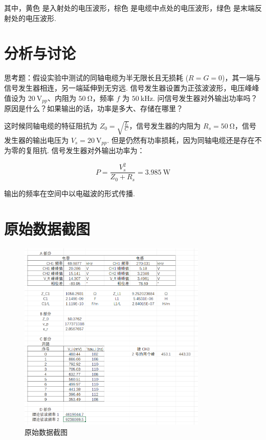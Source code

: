 \documentclass{customDoc}
\begin{document}

其中，\textcolor{yellowwave}{黄色} 是入射处的电压波形，\textcolor{orangewave}{棕色} 是电缆中点处的电压波形，\textcolor{greenwave}{绿色} 是末端反射处的电压波形.

\section{分析与讨论}

思考题：假设实验中测试的同轴电缆为半无限长且无损耗 ($R=G=0$)，其一端与信号发生器相连，另一端延伸到无穷远. 信号发生器设置为正弦波波形，电压峰峰值设为 $\SI{20}{\volt}_{pp}$、内阻为 $\SI{50}{\ohm}$，频率 $𝑓$ 为 $\SI{50}{\kilo\hertz}$. 问信号发生器对外输出功率吗？原因是什么？如果输出的话，功率是多大、存储在哪里？

这时候同轴电缆的特征阻抗为 $Z_0 = \sqrt{\frac{L}{C}}$，信号发生器的内阻为 $R_s = \SI{50}{\ohm}$，信号发生器的输出电压为 $V_s = \SI{20}{\volt}_{pp}$. 但是仍然有功率损耗，因为同轴电缆还是存在不为零的复阻抗. 信号发生器对外输出功率为：

\begin{equation}
    P = \frac{V_s^2}{Z_0 + R_s} = \SI{3.985}{\watt}
\end{equation}

输出的频率在空间中以电磁波的形式传播.

\section{原始数据截图}

\begin{figure}[H]
    \centering
    \includegraphics[width=0.8\textwidth]{originData.png}
    \caption{原始数据截图}
    \label{fig:original_data}
\end{figure}
\end{document}
